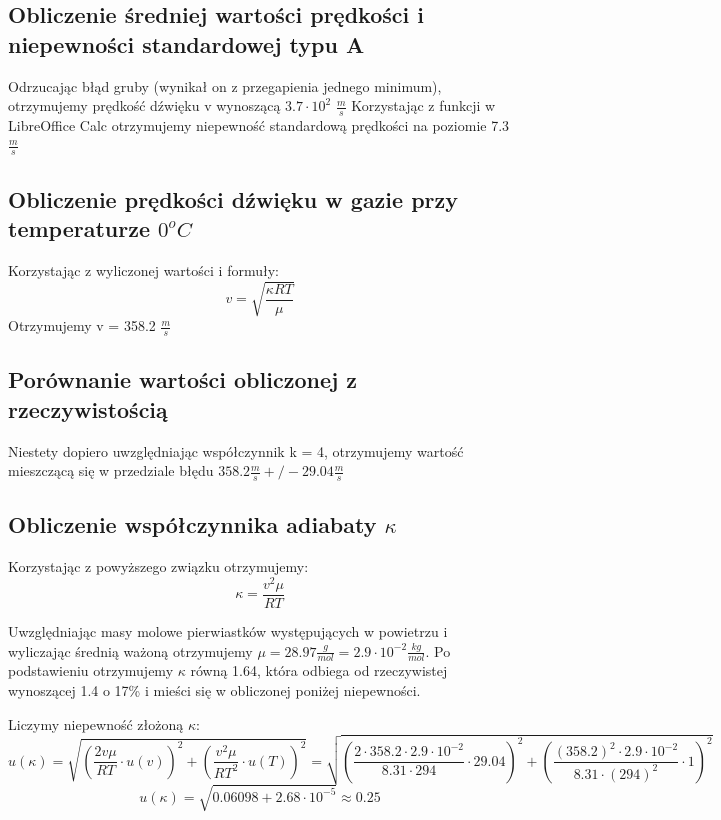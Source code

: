 \documentclass{article}
\begin{document}
\subsection{Obliczenie średniej wartości prędkości i niepewności standardowej typu A}
Odrzucając błąd gruby (wynikał on z przegapienia jednego minimum), otrzymujemy prędkość dźwięku v wynoszącą $3.7 \cdot 10^2$ $\frac{m}{s}$
Korzystając z funkcji w LibreOffice Calc otrzymujemy niepewność standardową prędkości na poziomie 7.3 $\frac{m}{s}$

\subsection{Obliczenie prędkości dźwięku w gazie przy temperaturze $0^{o} C$}
Korzystając z wyliczonej wartości i formuły:
\begin{equation}
	v = \sqrt{\frac{\kappa RT}{\mu}}
\end{equation}
Otrzymujemy v = 358.2 $\frac{m}{s}$

\subsection{Porównanie wartości obliczonej z rzeczywistością}
Niestety dopiero uwzględniając współczynnik k = 4, otrzymujemy wartość mieszczącą się w przedziale błędu $358.2 \frac{m}{s} +/- 29.04 \frac{m}{s}$

\subsection{Obliczenie współczynnika adiabaty $\kappa$}

Korzystając z powyższego związku otrzymujemy:
\begin{equation}
	\kappa = \frac{v^{2}\mu}{RT}
\end{equation}

Uwzględniając masy molowe pierwiastków występujących w powietrzu i wyliczając średnią ważoną otrzymujemy $\mu = 28.97 \frac{g}{mol} = 2.9 \cdot 10^{-2} \frac{kg}{mol}$. Po podstawieniu otrzymujemy $\kappa$ równą 1.64, która odbiega od rzeczywistej wynoszącej 1.4 o 17\% i mieści się w obliczonej poniżej niepewności.

Liczymy niepewność złożoną $\kappa$:
\begin{equation}
	u(\kappa) = \sqrt{(\frac{2v\mu}{RT} \cdot u(v))^2 + (\frac{v^2\mu}{RT^2} \cdot u(T))^2} = \sqrt{(\frac{2 \cdot 358.2 \cdot 2.9 \cdot 10^{-2}}{8.31 \cdot 294} \cdot 29.04)^2+(\frac{(358.2)^2 \cdot 2.9 \cdot 10^{-2}}{8.31 \cdot (294)^2} \cdot 1)^2}
\end{equation}
\begin{equation}
	u(\kappa) = \sqrt{0.06098+2.68 \cdot 10^{-5}} \approx 0.25
\end{equation}
\end{document}
